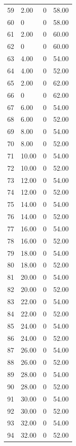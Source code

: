 \documentclass[a4paper,11pt]{article}
\begin{document}
\begin{center}
\begin{longtable}{|R{1.5cm}|R{2.4cm}|R{2.4cm}|R{2.4cm}|}
   59 &   2.00  & 0  &  58.00 \\ 
   60 & 0  & 0  &  58.00 \\ 
   61 &   2.00  & 0  &  60.00 \\ 
   62 & 0  & 0  &  60.00 \\ 
   63 &   4.00  & 0  &  54.00 \\ 
   64 &   4.00  & 0  &  52.00 \\ 
   65 &   2.00  & 0  &  62.00 \\ 
   66 & 0  & 0  &  62.00 \\ 
   67 &   6.00  & 0  &  54.00 \\ 
   68 &   6.00  & 0  &  52.00 \\ 
   69 &   8.00  & 0  &  54.00 \\ 
   70 &   8.00  & 0  &  52.00 \\ 
   71 &  10.00  & 0  &  54.00 \\ 
   72 &  10.00  & 0  &  52.00 \\ 
   73 &  12.00  & 0  &  54.00 \\ 
   74 &  12.00  & 0  &  52.00 \\ 
   75 &  14.00  & 0  &  54.00 \\ 
   76 &  14.00  & 0  &  52.00 \\ 
   77 &  16.00  & 0  &  54.00 \\ 
   78 &  16.00  & 0  &  52.00 \\ 
   79 &  18.00  & 0  &  54.00 \\ 
   80 &  18.00  & 0  &  52.00 \\ 
   81 &  20.00  & 0  &  54.00 \\ 
   82 &  20.00  & 0  &  52.00 \\ 
   83 &  22.00  & 0  &  54.00 \\ 
   84 &  22.00  & 0  &  52.00 \\ 
   85 &  24.00  & 0  &  54.00 \\ 
   86 &  24.00  & 0  &  52.00 \\ 
   87 &  26.00  & 0  &  54.00 \\ 
   88 &  26.00  & 0  &  52.00 \\ 
   89 &  28.00  & 0  &  54.00 \\ 
   90 &  28.00  & 0  &  52.00 \\ 
   91 &  30.00  & 0  &  54.00 \\ 
   92 &  30.00  & 0  &  52.00 \\ 
   93 &  32.00  & 0  &  54.00 \\ 
   94 &  32.00  & 0  &  52.00 \\ 

\end{longtable}
\end{center}
\end{document}
